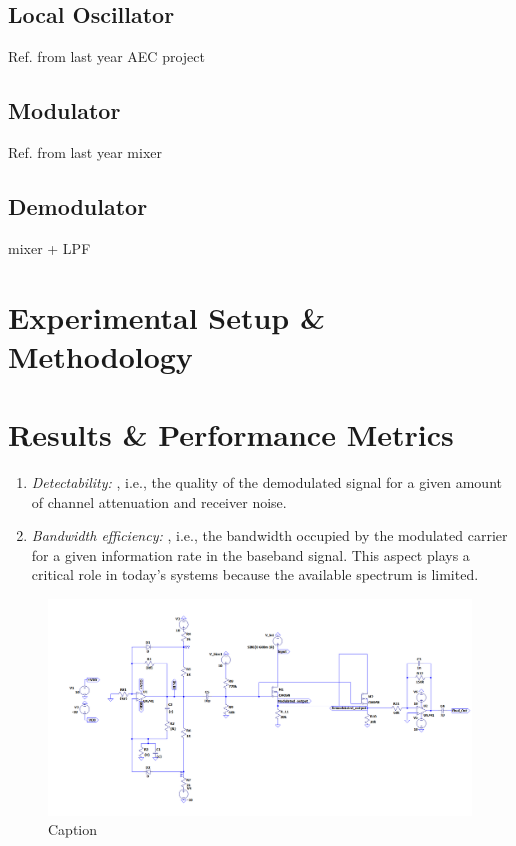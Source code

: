 \documentclass[conference]{IEEEtran}
\begin{document}
\subsection{Local Oscillator}
Ref. from last year AEC project
\subsection{Modulator}
Ref. from last year mixer
\subsection{Demodulator}
mixer + LPF



\section{Experimental Setup \& Methodology}

\section{Results \& Performance Metrics}


\begin{enumerate}
    \item \textit{Detectability: }, i.e., the quality of the demodulated signal for a given amount of channel attenuation and receiver noise.
    \item \textit{Bandwidth efficiency: }, i.e., the bandwidth occupied by the modulated carrier for a given information rate in the baseband signal. This aspect plays a critical role in today's systems because the available spectrum is limited.  
\end{enumerate}


\begin{figure}
    \centering
    \includegraphics[width=1\linewidth]{Images/Full_circuit_ltspice.png}
    \caption{Caption}
\end{figure}
\end{document}
